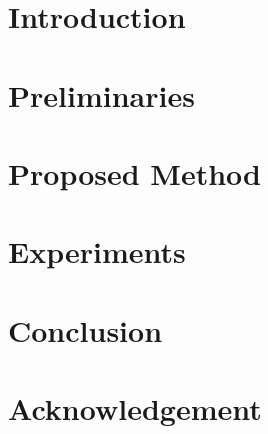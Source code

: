 \documentclass[10pt]{jarticle}
\begin{document}
\maketitle



\section{Introduction}\label{sec:Introduction}



\section{Preliminaries}\label{sec:Preliminaries}


\section{Proposed Method}\label{sec:ProposedMethod}



\section{Experiments}\label{sec:Experiments}


\section{Conclusion}\label{sec:Conclusion}


\section*{Acknowledgement}\label{sec:Acknowledgement}



\begin{spacing}{0.80}
    
    \small
    \setlength{\itemsep}{0pt}
    
\end{spacing}
\end{document}
